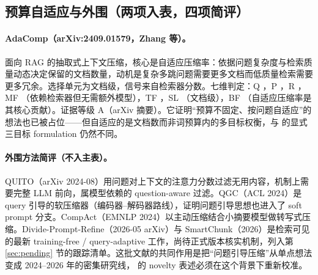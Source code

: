 \subsection{预算自适应与外围（两项入表，四项简评）}

\paragraph{AdaComp（arXiv:2409.01579，Zhang 等）。}
面向 RAG 的抽取式上下文压缩，核心是自适应压缩率：依据问题复杂度与检索质量动态决定保留的文档数量，动机是复杂多跳问题需要更多文档而低质量检索需要更多冗余。选择单元为文档级，信号来自检索器分数。七维判定：Q \ck{}，P \no{}，R \no{}，MF \partl{}（依赖检索器但无需额外模型），TF \ck{}，SL \no{}（文档级），BF \ck{}（自适应压缩率是其核心贡献）。证据等级 A（arXiv 摘要）。它证明``预算不固定、按问题自适应''的想法也已被占位——但自适应的是文档数而非词预算内的多目标权衡，与 \sieve{} 的显式三目标 formulation 仍然不同。

\paragraph{外围方法简评（不入主表）。}
QUITO（arXiv 2024-08）用问题对上下文的注意力分数过滤无用内容，机制上需要完整 LLM 前向，属模型依赖的 question-aware 过滤。QGC（ACL 2024）是 query 引导的软压缩器（编码器--解码器路线），证明问题引导思想也进入了 soft prompt 分支。CompAct（EMNLP 2024）以主动压缩结合小摘要模型做转写式压缩。Divide-Prompt-Refine（2026-05 arXiv）与 SmartChunk（2026）是检索可见的最新 training-free / query-adaptive 工作，尚待正式版本核实机制，列入第 \ref{sec:pending} 节的跟踪清单。这批文献的共同作用是把``问题引导压缩''从单点想法变成 2024--2026 年的密集研究线，\sieve{} 的 novelty 表述必须在这个背景下重新校准。
